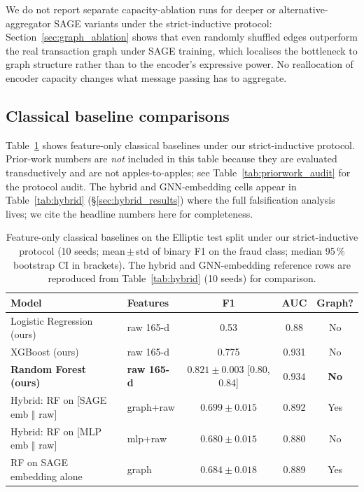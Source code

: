 We do not report separate capacity-ablation runs for deeper or
alternative-aggregator SAGE variants under the strict-inductive
protocol: Section~\ref{sec:graph_ablation} shows that even
randomly shuffled edges outperform the real transaction graph
under SAGE training, which localises the bottleneck to graph
structure rather than to the encoder's expressive power.  No
reallocation of encoder capacity changes what message passing has
to aggregate.

\subsection{Classical baseline comparisons}
\label{sec:classical}

Table~\ref{tab:classical} shows feature-only classical baselines under
our strict-inductive protocol.  Prior-work numbers are \emph{not}
included in this table because they are evaluated transductively and
are not apples-to-apples; see Table~\ref{tab:priorwork_audit} for the
protocol audit.  The hybrid and GNN-embedding cells appear in
Table~\ref{tab:hybrid} (\S\ref{sec:hybrid_results}) where the full falsification
analysis lives; we cite the headline numbers here for completeness.

\begin{table}[htbp]
\centering
\caption{Feature-only classical baselines on the Elliptic test split
  under our strict-inductive protocol (10 seeds; mean\,$\pm$\,std of
  binary F1 on the fraud class; median 95\,\% bootstrap CI in brackets).
  The hybrid and GNN-embedding reference rows are reproduced from
  Table~\ref{tab:hybrid} (10 seeds) for comparison.}
\label{tab:classical}
\small
\begin{tabular}{llccc}
\toprule
\textbf{Model} & \textbf{Features} & \textbf{F1} & \textbf{AUC} & \textbf{Graph?} \\
\midrule
Logistic Regression (ours) & raw 165-d & 0.53\phantom{0} & 0.88\phantom{0} & No \\
XGBoost (ours)             & raw 165-d & 0.775           & 0.931           & No \\
\textbf{Random Forest (ours)} & \textbf{raw 165-d}
   & $\mathbf{0.821\!\pm\!0.003}$ [0.80, 0.84]
   & $\mathbf{0.934}$ & \textbf{No} \\
\midrule
Hybrid: RF on [SAGE emb $\Vert$ raw] & graph+raw
   & $0.699\!\pm\!0.015$  & 0.892 & Yes \\
Hybrid: RF on [MLP emb $\Vert$ raw]  & mlp+raw
   & $0.680\!\pm\!0.015$  & 0.880 & No  \\
RF on SAGE embedding alone           & graph
   & $0.684\!\pm\!0.018$  & 0.889 & Yes \\
\bottomrule
\end{tabular}
\end{table}

